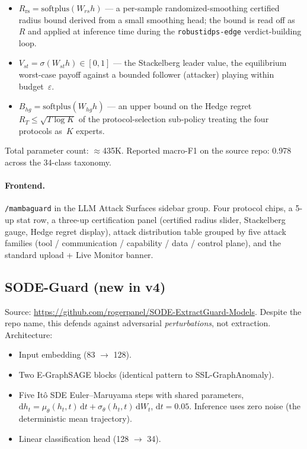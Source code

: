 \documentclass[11pt,a4paper]{article}
\begin{document}
\begin{itemize}[nosep,leftmargin=*]
  \item \(R_{\!\mathrm{rs}} = \mathrm{softplus}(W_{\!rs} h)\) --- a
        per-sample randomized-smoothing certified radius bound
        derived from a small smoothing head; the bound is read
        off as~\(R\) and applied at inference time during the
        \texttt{robustidps-edge} verdict-building loop.
  \item \(V_{\!st} = \sigma(W_{\!st} h) \in [0, 1]\) --- the
        Stackelberg leader value, the equilibrium worst-case payoff
        against a bounded follower (attacker) playing within
        budget~\(\varepsilon\).
  \item \(B_{\!hg} = \mathrm{softplus}(W_{\!hg} h)\) --- an upper
        bound on the Hedge regret~\(R_T \leq \sqrt{T \log K}\) of
        the protocol-selection sub-policy treating the four protocols
        as~\(K\) experts.
\end{itemize}

Total parameter count: $\approx$435K.  Reported macro-F1 on the source
repo: 0.978 across the 34-class taxonomy.

\paragraph{Frontend.}
\texttt{/mambaguard} in the LLM Attack Surfaces sidebar group.  Four
protocol chips, a 5-up stat row, a three-up certification panel
(certified radius slider, Stackelberg gauge, Hedge regret display),
attack distribution table grouped by five attack families
(tool / communication / capability / data / control plane), and the
standard upload + Live Monitor banner.

\subsection{SODE-Guard (new in v4)}
\label{sec:sode_guard}

Source: \url{https://github.com/rogerpanel/SODE-ExtractGuard-Models}.
Despite the repo name, this defends against adversarial
\emph{perturbations}, not extraction.  Architecture:

\begin{itemize}[nosep,leftmargin=*]
  \item Input embedding (83 $\to$ 128).
  \item Two E-GraphSAGE blocks (identical pattern to
        SSL-GraphAnomaly).
  \item Five It\^o SDE Euler--Maruyama steps with shared parameters,
        \(\mathrm{d}h_t = \mu_\theta(h_t, t)\,\mathrm{d}t +
        \sigma_\theta(h_t, t)\,\mathrm{d}W_t\),
        \(\mathrm{d}t = 0.05\).  Inference uses zero noise (the
        deterministic mean trajectory).
  \item Linear classification head (128 $\to$ 34).
\end{itemize}
\end{document}
